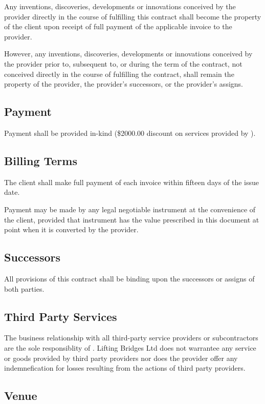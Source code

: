 \documentclass[11pt]{article}
\begin{document}
Any inventions, discoveries, developments or innovations conceived by
the provider directly in the course of fulfilling this contract shall
become the property of the client upon receipt of full payment of the
applicable invoice to the provider.

However, any inventions, discoveries, developments or innovations
conceived by the provider prior to, subsequent to, or during the term of
the contract, not conceived directly in the course of fulfilling the
contract, shall remain the property of the provider, the provider's
successors, or the provider's assigns.

\subsection{Payment}

Payment shall be provided in-kind (\$2000.00 discount on services
provided by \theclient).

\subsection{Billing Terms}

The client shall make full payment of each invoice within fifteen days
of the issue date. 

Payment may be made by any legal negotiable instrument at the
convenience of the client, provided that instrument has the value
prescribed in this document at point when it is converted by the
provider.

\subsection{Successors}

All provisions of this contract shall be binding upon the successors or
assigns of both parties.

\subsection{Third Party Services}

The business relationship with all third-party service providers or
subcontractors are the sole responsiblity of \theclient. Lifting
Bridges Ltd does not warrantee any service or goods provided by
third party providers nor does the provider offer any indemnefication
for losses resulting from the actions of third party providers.

\subsection{Venue}
\end{document}
